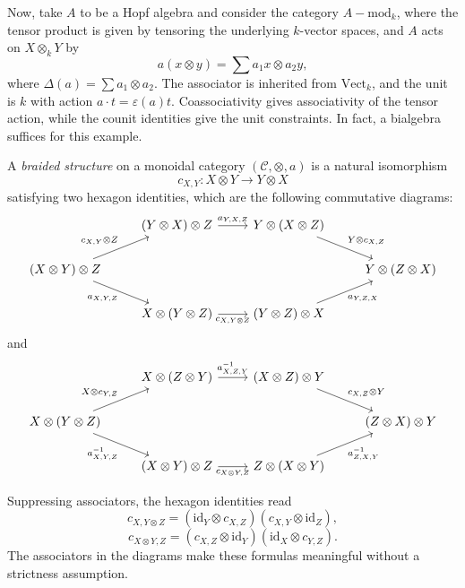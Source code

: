 \begin{example}
    Now, take $A$ to be a Hopf algebra and consider the category $A-\text{mod}_k$, where the tensor product is given by tensoring the underlying $k$-vector spaces, and $A$ acts on $X \otimes_k Y$ by
    \[a(x \otimes y) = \sum a_1 x \otimes a_2 y,\]
    where $\Delta(a) = \sum a_1 \otimes a_2$.
    The associator is inherited from $\text{Vect}_k$, and the unit is $k$ with action $a\cdot t=\varepsilon(a)t$. Coassociativity gives associativity of the tensor action, while the counit identities give the unit constraints. In fact, a bialgebra suffices for this example.
\end{example}

\begin{definition}
    A \textit{braided structure} on a monoidal category $(\mathcal{C}, \otimes, a)$ is a natural isomorphism
    \[c_{X,Y}:X\otimes Y\to Y\otimes X\]
    satisfying two hexagon identities, which are the following commutative diagrams:
    \[\begin{tikzcd}
	& {(Y \otimes X) \otimes Z} & {Y \otimes (X \otimes Z)} \\
	{(X \otimes Y) \otimes Z} &&& {Y \otimes (Z \otimes X)} \\
	& {X \otimes(Y \otimes Z)} & {(Y \otimes Z) \otimes X}
	\arrow["{a_{Y,X,Z}}", from=1-2, to=1-3]
	\arrow["{Y \otimes c_{X,Z}}", from=1-3, to=2-4]
	\arrow["{c_{X,Y} \otimes Z}", from=2-1, to=1-2]
	\arrow["{a_{X,Y,Z}}"', from=2-1, to=3-2]
	\arrow["{c_{X,Y \otimes Z}}"', from=3-2, to=3-3]
	\arrow["{a_{Y,Z,X}}"', from=3-3, to=2-4]
    \end{tikzcd}\]   
    and
    \[\begin{tikzcd}
	& {X \otimes (Z \otimes Y)} & {(X \otimes Z) \otimes Y} \\
	{X \otimes (Y\otimes Z)} &&& {(Z \otimes X) \otimes Y} \\
	& {(X \otimes Y) \otimes Z} & {Z \otimes (X \otimes Y)}
	\arrow["{a^{-1}_{X,Z,Y}}", from=1-2, to=1-3]
	\arrow["{c_{X,Z} \otimes Y}", from=1-3, to=2-4]
	\arrow["{X \otimes c_{Y,Z}}", from=2-1, to=1-2]
	\arrow["{a^{-1}_{X,Y,Z}}"', from=2-1, to=3-2]
	\arrow["{c_{X \otimes Y, Z}}"', from=3-2, to=3-3]
	\arrow["{a^{-1}_{Z,X,Y}}"', from=3-3, to=2-4]
\end{tikzcd}\]
\end{definition}

Suppressing associators, the hexagon identities read
\[
 c_{X,Y\otimes Z}=(\mathrm{id}_Y\otimes c_{X,Z})(c_{X,Y}\otimes\mathrm{id}_Z),
\]
\[
 c_{X\otimes Y,Z}=(c_{X,Z}\otimes\mathrm{id}_Y)(\mathrm{id}_X\otimes c_{Y,Z}).
\]
The associators in the diagrams make these formulas meaningful without a strictness assumption.

